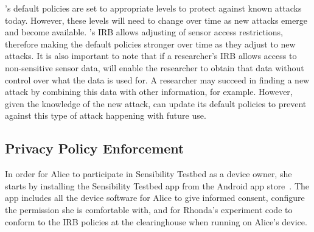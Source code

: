 \sysname's default policies are set to appropriate levels to protect against 
known attacks today. %
However, these levels will need to change over time as
new attacks emerge and become available. \sysname's IRB allows adjusting 
of sensor access restrictions, therefore making the default policies
stronger over time as they adjust to new attacks. It is also important to note that 
if a researcher's IRB allows access to non-sensitive sensor data, \sysname will 
enable the researcher to obtain that data without control over what the data is used for.
A researcher may succeed in finding a new attack by combining this data with other 
information, for example. However, given the 
knowledge of the new attack, \sysname can update its default policies to prevent against
this type of attack happening with future use. 
%
%
%


\subsection{Privacy Policy Enforcement}\label{sec-repy}

In order for Alice to participate in Sensibility Testbed as a device owner,
she starts by installing the Sensibility Testbed app from 
the Android app store~\cite{sensibility-app}. The app includes all the device
software for Alice to give informed consent, configure the permission she
is comfortable with, and for Rhonda's experiment code to conform to the 
IRB policies at the clearinghouse when running on Alice's device.

